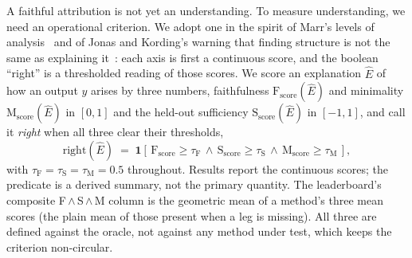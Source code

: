 A faithful attribution is not yet an understanding. To measure understanding, we need an
operational criterion. We adopt one in the spirit of Marr's levels of
analysis~\cite{marr1982vision} and of Jonas and Kording's warning that finding structure is
not the same as explaining it~\cite{jonas2017could}: each axis is first a continuous score,
and the boolean ``right'' is a thresholded reading of those scores. We score an
explanation $\hat{E}$ of how an output $y$ arises by three numbers, faithfulness
$\mathrm{F}_{\mathrm{score}}(\hat{E})$ and minimality $\mathrm{M}_{\mathrm{score}}(\hat{E})$
in $[0,1]$ and the held-out sufficiency $\mathrm{S}_{\mathrm{score}}(\hat{E})$ in $[-1,1]$,
and call it \emph{right} when all three clear their thresholds,
\begin{equation}
  \mathrm{right}(\hat{E}) \;=\; \mathbf{1}\!\left[\,
  \mathrm{F}_{\mathrm{score}}\!\ge\!\tau_{\mathrm{F}} \,\wedge\,
  \mathrm{S}_{\mathrm{score}}\!\ge\!\tau_{\mathrm{S}} \,\wedge\,
  \mathrm{M}_{\mathrm{score}}\!\ge\!\tau_{\mathrm{M}}\,\right],
  \label{eq:triad}
\end{equation}
with $\tau_{\mathrm{F}}=\tau_{\mathrm{S}}=\tau_{\mathrm{M}}=0.5$ throughout. Results report the
continuous scores; the predicate is a derived summary, not the primary quantity. The
leaderboard's composite F\,$\wedge$\,S\,$\wedge$\,M column is the geometric mean of a method's
three mean scores (the plain mean of those present when a leg is missing). All three are
defined against the oracle, not against any method under test, which keeps the criterion
non-circular.

